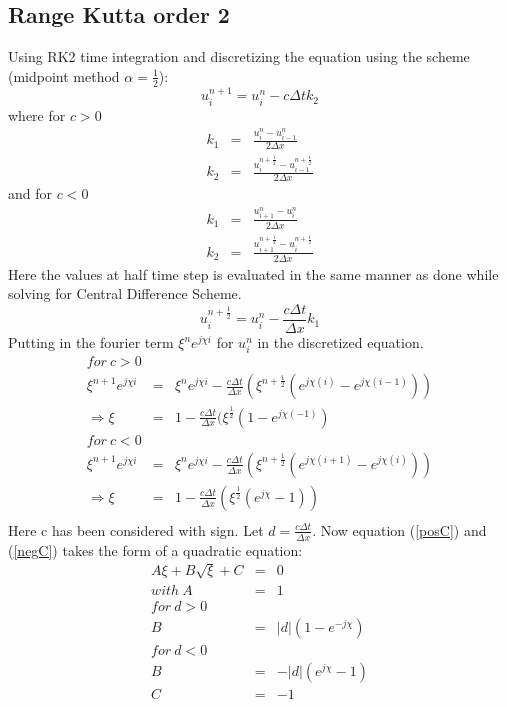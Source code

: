 \documentclass[a4paper,12pt]{report}
\begin{document}
\subsection{Range Kutta order 2}
Using RK2 time integration and discretizing the equation using the scheme (midpoint method $\alpha = \frac{1}{2}$):
\[u^{n+1}_{i} = u^{n}_{i} - c\Delta t k_2\]
where for $c>0$
\begin{eqnarray}
k_1 &=& \frac{u_{i}^{n} -u_{i-1}^{n}}{2\Delta x} \nonumber \\
k_2 &=& \frac{u_{i}^{n+\frac{1}{2}} -u_{i-1}^{n+\frac{1}{2}}}{2\Delta x} \nonumber
\end{eqnarray}
and for $c<0$
\begin{eqnarray}
k_1 &=& \frac{u_{i+1}^{n} -u_{i}^{n}}{2\Delta x} \nonumber \\
k_2 &=& \frac{u_{i+1}^{n+\frac{1}{2}} -u_{i}^{n+\frac{1}{2}}}{2\Delta x} \nonumber
\end{eqnarray}
Here the values at half time step is evaluated in the same manner as done while solving for Central Difference Scheme.
\[u_{i}^{n+\frac{1}{2}} = u_{i}^{n} - \frac{c\Delta t}{\Delta x}k_1 \]
Putting in the fourier term $\xi^{n}e^{j\chi i}$ for $u^{n}_{i}$ in the discretized equation.
\begin{eqnarray}
for\ c>0\\
\xi^{n+1}e^{j\chi i} &=& \xi^{n}e^{j\chi i} -\frac{c\Delta t}{\Delta x}(\xi^{n+\frac{1}{2}}(e^{j\chi(i)}-e^{j\chi(i-1)})) \\
\Rightarrow \xi&=& 1 -\frac{c\Delta t}{\Delta x}(\xi^{\frac{1}{2}}(1-e^{j\chi(-1)}) \nonumber \label{posC} \\
for\ c<0\\
\xi^{n+1}e^{j\chi i} &=& \xi^{n}e^{j\chi i} -\frac{c\Delta t}{\Delta x}(\xi^{n+\frac{1}{2}}(e^{j\chi(i+1)}-e^{j\chi(i)})) \\
\Rightarrow\xi&=& 1 -\frac{c\Delta t}{\Delta x}(\xi^{\frac{1}{2}}(e^{j\chi}-1)) \nonumber\label{negC} \\
\end{eqnarray}
Here c has been considered with sign. Let $d=\frac{c\Delta t}{\Delta x}$. Now equation (\ref{posC}) and (\ref{negC}) takes the form of a quadratic equation:
\begin{eqnarray*}
A\xi + B\sqrt{\xi} + C &=&0 \\
with\ A &=& 1 \\
for\  d>0 \\ B &=& |d|(1-e^{-j\chi}) \\
for\  d<0 \\B &=& -|d|(e^{j\chi} -1) \\
C &=& -1
\end{eqnarray*}
\end{document}
